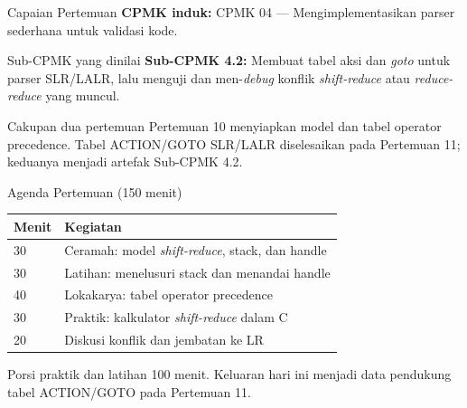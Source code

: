 \documentclass[aspectratio=169,10pt,t]{beamer}
\begin{document}

\begin{frame}{Capaian Pertemuan}
  \textbf{CPMK induk:} CPMK 04 --- Mengimplementasikan parser sederhana
  untuk validasi kode.

  \vspace{3pt}
  \begin{block}{Sub-CPMK yang dinilai}
    \small
    \textbf{Sub-CPMK 4.2:} Membuat tabel aksi dan \textit{goto} untuk
    parser SLR/LALR, lalu menguji dan men-\textit{debug} konflik
    \textit{shift-reduce} atau \textit{reduce-reduce} yang muncul.
  \end{block}

  \vspace{3pt}
  \begin{exampleblock}{Cakupan dua pertemuan}
    \footnotesize
    Pertemuan 10 menyiapkan model  dan tabel
    operator precedence. Tabel ACTION/GOTO SLR/LALR diselesaikan pada
    Pertemuan 11; keduanya menjadi artefak Sub-CPMK 4.2.
  \end{exampleblock}
\end{frame}

\begin{frame}{Agenda Pertemuan (150 menit)}
  \small
  \begin{tabular}{@{}p{1.4cm}p{12.3cm}@{}}
    \toprule
    \textbf{Menit} & \textbf{Kegiatan} \\
    \midrule
    30 & Ceramah: model \textit{shift-reduce}, stack, dan handle \\
    30 & Latihan: menelusuri stack dan menandai handle \\
    40 & Lokakarya: tabel operator precedence \\
    30 & Praktik: kalkulator \textit{shift-reduce} dalam C \\
    20 & Diskusi konflik dan jembatan ke LR \\
    \bottomrule
  \end{tabular}

  \vspace{6pt}
  {\scriptsize\color{ubbblue!75}Porsi praktik dan latihan 100 menit.
  Keluaran hari ini menjadi data pendukung tabel ACTION/GOTO pada
  Pertemuan 11.}
\end{frame}
\end{document}
